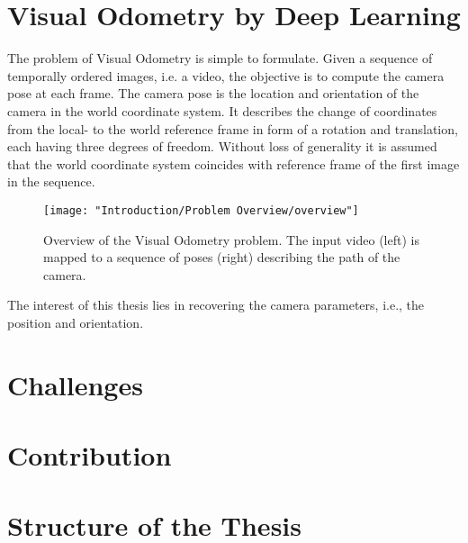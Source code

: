 		
		
		
		
		
		
		
	\section{Visual Odometry by Deep Learning}
		The problem of Visual Odometry is simple to formulate.
		Given a sequence of temporally ordered images, i.e. a video, the objective is to compute the camera pose at each frame.
		The camera pose is the location and orientation of the camera in the world coordinate system.
		It describes the change of coordinates from the local- to the world reference frame in form of a rotation and translation, each having three degrees of freedom.
		Without loss of generality it is assumed that the world coordinate system coincides with reference frame of the first image in the sequence.
		
		
		\begin{figure}[t]
			\centering
			\texttt{[image: "Introduction/Problem Overview/overview"]}
			\caption[Description of the Visual Odometry problem]
					{Overview of the Visual Odometry problem.
					 The input video (left) is mapped to a sequence of poses (right) describing the path of the camera.
					 \label{fig:overview-visual-odometry}}
		\end{figure}
		
		The interest of this thesis lies in recovering the camera parameters, i.e., the position and orientation.
	
	
	\section{Challenges}
	
	\section{Contribution}
	
	\section{Structure of the Thesis}